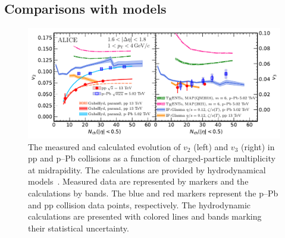 \subsection{Comparisons with models}
\label{sec:theory}

\begin{figure}[h!]
	\centering
	\includegraphics[width=1.0\textwidth]{figures/FIG7_v2Mult_allSystems_Hydro.pdf} 
	\caption{The measured and calculated evolution of $v_2$ (left) and $v_3$ (right) in pp and p--Pb collisions as a function of charged-particle multiplicity at midrapidity. The calculations are provided by hydrodynamical models~\cite{Parkkila:2021yha,Bernhard:2016tnd,Schenke:2020mbo,Taghavi:2019mqz}. Measured data are represented by markers and the calculations by bands.
    The blue and red markers represent the p--Pb and pp collision data points, respectively. The hydrodynamic calculations are presented with colored lines and bands marking their statistical uncertainty.} 
	\label{fig:vnmult_model}
\end{figure}

